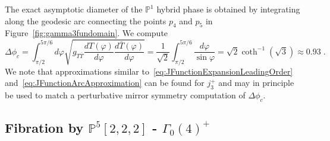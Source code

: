 \documentclass[11pt,a4paper]{article}
\numberwithin{equation}{section}
\numberwithin{table}{section}\setlength{\multlinegap}{25pt}
\begin{document}
The exact asymptotic diameter of the $\mathbb{P}^1$ hybrid phase is obtained by integrating along the geodesic arc connecting the points $p_4$ and $p_5$ in Figure~\ref{fig:gamma3fundomain}. We compute
\begin{equation}
    \label{eq:112222DeltaPhiExact}
    \Delta\phi_c=\int_{\pi/2}^{5\pi/6}d\varphi \sqrt{g_{T\bar{T}}\frac{d T(\varphi)}{d\varphi}\frac{d \bar{T}(\varphi)}{d\varphi}}=\frac{1}{\sqrt{2}}\int_{\pi/2}^{5\pi/6} \frac{d\varphi}{\sin\varphi}=\sqrt{2}\coth^{-1}\left(\sqrt{3}\right)\approx 0.93\;.
\end{equation}
We note that approximations similar to~\eqref{eq:JFunctionExpansionLeadingOrder} and~\eqref{eq:JFunctionArcApproximation} can be found for $j_3^+$ and may in principle be used to match a perturbative mirror symmetry computation of $\Delta\phi_c$.

\subsection{Fibration by \texorpdfstring{$\mathbb{P}^5[2,2,2]$}{codimension 3 K3} - \texorpdfstring{$\Gamma_0(4)^+$}{Gamma0+(4)}}
\label{subsec:1122222}
\end{document}
